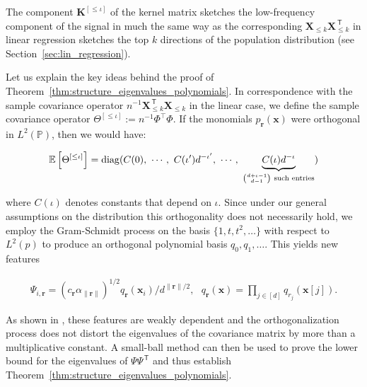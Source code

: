 	The component $\boldsymbol{K}^{[\leq \iota]}$ of the kernel matrix sketches the low-frequency component of the signal in much the same way as the corresponding ${\boldsymbol X}_{\leq k}{\boldsymbol X}_{\leq k}^\ensuremath{{\scriptscriptstyle\mathsf{\,T}}}$ in linear regression sketches the top $k$ directions of the population distribution (see Section~\ref{sec:lin_regression}).

Let us explain the key ideas behind the proof of Theorem~\ref{thm:structure_eigenvalues_polynomials}.
	In correspondence with the sample covariance operator $n^{-1}{\boldsymbol X}_{\leq k}^\ensuremath{{\scriptscriptstyle\mathsf{\,T}}} {\boldsymbol X}_{\leq k}$ in the linear case, we define the sample covariance operator 
	$\Theta^{[\leq \iota]} := n^{-1} \Phi^\top \Phi.$ 
	If the monomials $p_{{\boldsymbol r}}({\boldsymbol x})$ were orthogonal in
    $L^2(\mathbb{P})$,
    then we would have:

\begin{align*}
			\mathbb{E}\left[ \Theta^{[\leq \iota]} \right] = {\rm diag}(C(0),~ \cdots, ~C(\iota')d^{-\iota'} ,~  \cdots,~ \underbrace{C(\iota) d^{-\iota}}_{\binom{d+\iota-1}{d-1}~\text{such entries}} )
		\end{align*}

	where $C(\iota)$  denotes constants that depend on $\iota$. Since under our general assumptions on the distribution this orthogonality does not necessarily hold, we employ the Gram-Schmidt process on the basis $\{1,t,t^2,\ldots\}$ with respect to $L^2(p)$ to produce an orthogonal polynomial basis $q_0,q_1,\ldots$. This yields new features

\begin{align*}
		\Psi_{i,{\boldsymbol r}} = \left(c_{{\boldsymbol r}} \alpha_{\left\|{\boldsymbol r}\right\|}\right)^{1/2} q_{{\boldsymbol r}}({\boldsymbol x}_i) / d^{\left\|{\boldsymbol r}\right\|/2},~~~ q_{{\boldsymbol r}}({\boldsymbol x})=\prod_{j \in [d]} q_{r_j}({\boldsymbol x}[j]).
	\end{align*}

	As shown in \cite{liang2020multiple}, these features are weakly dependent and the orthogonalization process does not distort the eigenvalues of the covariance matrix by more than a multiplicative constant. A small-ball method \cite{koltchinskii2015bounding} can then be used to prove the lower bound for the eigenvalues of $\Psi\Psi^\ensuremath{{\scriptscriptstyle\mathsf{\,T}}}$ and thus establish Theorem~\ref{thm:structure_eigenvalues_polynomials}.


